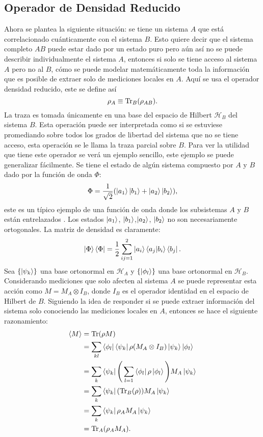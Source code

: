 \subsection{Operador de Densidad Reducido}

Ahora se plantea la siguiente situación: se tiene un sistema $A$ que está correlacionado cuánticamente  con el sistema $B$. Esto quiere decir que el sistema completo $AB$ puede estar dado por un estado puro pero aún así no se puede describir individualmente el sistema $A$, entonces si solo se tiene acceso al sistema $A$ pero no al $B$, cómo se puede modelar matemáticamente toda la información que es posible de extraer solo de mediciones locales en $A$. Aquí se usa el operador densidad reducido, este se define así
\begin{equation}
\rho_{A} \equiv \Tr_{B}(\rho_{AB}).
\end{equation}
La traza es tomada únicamente en una base del espacio de Hilbert $\mathcal{H}_{B}$ del sistema $B$. Esta operación puede ser interpretada como si se estuviese promediando sobre todos los grados de libertad del sistema que no se tiene acceso, esta operación se le llama la traza parcial sobre $B$. Para ver la utilidad que tiene este operador se verá un ejemplo sencillo, este ejemplo se puede generalizar fácilmente.
Se tiene el estado de algún sistema compuesto por $A$ y $B$ dado por la función de onda $\Phi$:
\begin{equation}
\Phi = \frac{1}{\sqrt{2}} (\ket{a_{1}}\ket{b_{1}}+\ket{a_{2}}\ket{b_{2}}),
\end{equation}
este es un típico ejemplo de una función de onda donde los subsistemas $A$ y $B$ están entrelazados \cite{SusskindQuantum}. Los estados $\ket{a_{1}}$, $\ket{b_{1}}$,$\ket{a_{2}}$, $\ket{b_{2}}$ no son necesariamente ortogonales. La matriz de densidad es claramente:
\begin{equation}
\ket{\Phi}\bra{\Phi} = \frac{1}{2}\sum_{ij=1}^{2} \ket{a_{i}}\bra{a_{j}} \ket{b_{i}}\bra{b_{j}} .
\end{equation}
Sea $ \{ \ket{\psi_{k}} \} $ una base ortonormal en $\mathcal{H}_{A}$ y  $ \{ \ket{\phi_{l}} \} $ una base ortonormal en $\mathcal{H}_{B}$. Considerando mediciones que solo afecten al sistema $A$ se puede representar esta acción como $M=M_{A} \otimes I_{B}$, donde $I_{B}$ es el operador identidad en el espacio de Hilbert de $B$. Siguiendo la idea de responder si se puede extraer información del sistema solo conociendo las mediciones locales en $A$, entonces se hace el siguiente razonamiento:
\begin{align}
\langle M \rangle &=  \Tr(\rho M)\\
\quad &=\sum_{kl} \bra{\phi_{l}}\bra{\psi_{k}}\rho(M_{A} \otimes I_{B})\ket{\psi_{k}} \ket{\phi_{l}}\\
\quad &=\sum_{k}\bra{\psi_{k}}  \Bigg( \sum_{l=1} \bra{\phi_{l}} \rho\ket{\phi_{l}} \Bigg) M_{A}\ket{\psi_{k}}\\
\quad &=\sum_{k}\bra{\psi_{k}} ( \Tr_{B}(\rho) )  M_{A}\ket{\psi_{k}}\\
\quad &=\sum_{k}\bra{\psi_{k}} \rho_{A}  M_{A}\ket{\psi_{k}}\\
\quad &= \Tr_{A} (\rho_{A} M_{A}).
\end{align}
